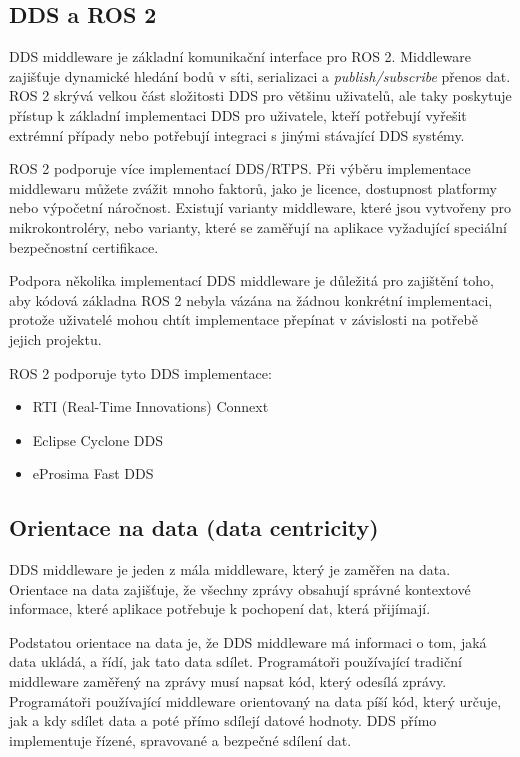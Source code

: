 \subsection{\acs{DDS} a ROS 2}

\acs{DDS} middleware je základní komunikační interface pro ROS 2. Middleware zajišťuje dynamické hledání bodů v síti, serializaci a \textit{publish/subscribe} přenos dat. ROS 2 skrývá velkou část složitosti \acs{DDS} pro většinu uživatelů, ale taky poskytuje přístup k základní implementaci \acs{DDS} pro uživatele, kteří potřebují vyřešit extrémní případy nebo potřebují integraci s jinými stávající \acs{DDS} systémy. \cite{ROS2DDS}

ROS 2 podporuje více implementací \acs{DDS}/RTPS. Při výběru implementace middlewaru můžete zvážit mnoho faktorů, jako je licence, dostupnost platformy nebo výpočetní náročnost. Existují varianty middleware, které jsou vytvořeny pro mikrokontroléry, nebo varianty, které se zaměřují na aplikace vyžadující speciální bezpečnostní certifikace.

Podpora několika implementací \acs{DDS} middleware je důležitá pro zajištění toho, aby kódová základna ROS 2 nebyla vázána na žádnou konkrétní implementaci, protože uživatelé mohou chtít implementace přepínat v závislosti na potřebě jejich projektu. \cite{ROS2DDS2}

ROS 2 podporuje tyto \acs{DDS} implementace:
\begin{itemize}
    \item RTI (Real-Time Innovations) Connext
    \item Eclipse Cyclone DDS
    \item eProsima Fast DDS
\end{itemize}

\subsection{Orientace na data (data centricity)}

\acs{DDS} middleware je jeden z mála middleware, který je zaměřen na data. Orientace na data zajišťuje, že všechny zprávy obsahují správné kontextové informace, které aplikace potřebuje k pochopení dat, která přijímají.

Podstatou orientace na data je, že \acs{DDS} middleware má informaci o tom, jaká data ukládá, a řídí, jak tato data sdílet. Programátoři používající tradiční middleware zaměřený na zprávy musí napsat kód, který odesílá zprávy. Programátoři používající middleware orientovaný na data píší kód, který určuje, jak a kdy sdílet data a poté přímo sdílejí datové hodnoty. \acs{DDS} přímo implementuje řízené, spravované a bezpečné sdílení dat. \cite{DDS_Main}

